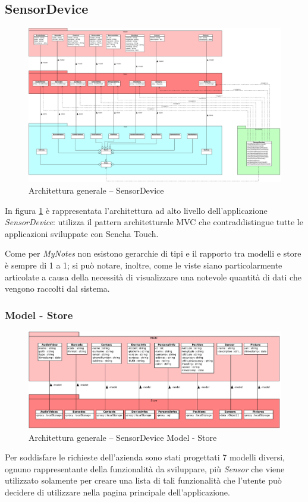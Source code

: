 \subsection{SensorDevice}
\begin{figure}[htb]
\centering
\includegraphics[scale=0.4,angle=90]{gfx/class/SensorDevice.pdf}
\caption{Architettura generale -- SensorDevice}
\label{fig:architettura SensorDevice}
\end{figure}
In figura \ref{fig:architettura SensorDevice} è rappresentata l'architettura ad alto livello dell'applicazione \emph{SensorDevice}: utilizza il pattern architetturale \ac{MVC} che contraddistingue tutte le applicazioni sviluppate con Sencha Touch.

Come per \emph{MyNotes} non esistono gerarchie di tipi e il rapporto tra modelli e store è sempre di 1 a 1; si può notare, inoltre, come le viste siano particolarmente articolate a causa della necessità di visualizzare una notevole quantità di dati che vengono raccolti dal sistema.

\subsubsection{Model - Store}
\begin{figure}[htb]
\centering
\includegraphics[scale=0.4]{gfx/class/SensorDevice_Model_Store.pdf}
\caption{Architettura generale -- SensorDevice Model - Store}
\label{fig:architettura SensorDevice Model-Store}
\end{figure}
Per soddisfare le richieste dell'azienda sono stati progettati 7 modelli diversi, ognuno rappresentante della funzionalità da sviluppare, più \emph{Sensor} che viene utilizzato solamente per creare una lista di tali funzionalità che l'utente può decidere di utilizzare nella pagina principale dell'applicazione.

